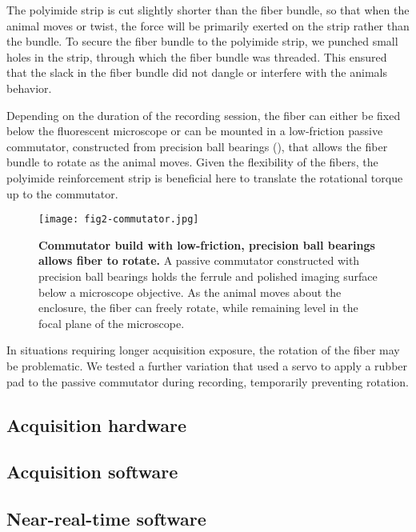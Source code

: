 The polyimide strip is cut slightly shorter than the fiber 
bundle, so that when the animal moves or twist, the force 
will be primarily exerted on the strip rather than the bundle.
To secure the fiber bundle to the polyimide strip, we 
punched small holes in the strip, through which the 
fiber bundle was threaded. This ensured that the slack 
in the fiber bundle did not dangle or interfere with 
the animals behavior.

Depending on the duration of the recording session, the 
fiber can either be fixed below the fluorescent microscope 
or can be mounted in a low-friction passive commutator,
constructed from precision ball bearings (), that allows 
the fiber bundle to rotate as the animal moves. Given the 
flexibility of the fibers, the polyimide reinforcement 
strip is beneficial here to translate the rotational 
torque up to the commutator.

\begin{figure}
\texttt{[image: fig2-commutator.jpg]}
\caption[Commutator for awake behaving recording]{\textbf{Commutator
build with low-friction, precision ball bearings allows fiber to 
rotate.} A passive commutator constructed with precision ball 
bearings holds the ferrule and polished imaging surface below 
a microscope objective. As the animal moves about the enclosure,
the fiber can freely rotate, while remaining level in the focal 
plane of the microscope.}
\label{fig:commutator}
\end{figure}

In situations requiring longer acquisition exposure, the 
rotation of the fiber may be problematic. We tested a 
further variation that used a servo to apply a rubber pad 
to the passive commutator during recording, temporarily 
preventing rotation.

\subsection{Acquisition hardware}


\subsection{Acquisition software}


\subsection{Near-real-time software}

